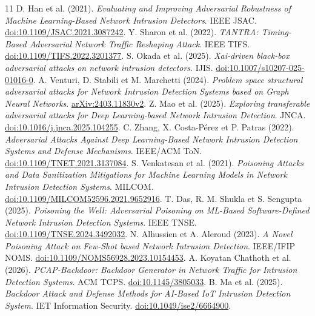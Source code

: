 \documentclass[a4paper,10pt]{article}
\begin{document}
\begingroup
\small
\setlength{\parskip}{0pt}
\renewcommand{\refname}{Références du corpus}
\begin{thebibliography}{11}
\setlength{\itemsep}{1pt}
 D. Han et al. (2021). \emph{Evaluating and Improving Adversarial
Robustness of Machine Learning-Based Network Intrusion Detectors}. IEEE JSAC.
\href{https://doi.org/10.1109/JSAC.2021.3087242}{doi:10.1109/JSAC.2021.3087242}.
 Y. Sharon et al. (2022). \emph{TANTRA: Timing-Based Adversarial
Network Traffic Reshaping Attack}. IEEE TIFS.
\href{https://doi.org/10.1109/TIFS.2022.3201377}{doi:10.1109/TIFS.2022.3201377}.
 S. Okada et al. (2025). \emph{Xai-driven black-box adversarial
attacks on network intrusion detectors}. IJIS.
\href{https://doi.org/10.1007/s10207-025-01016-0}{doi:10.1007/s10207-025-01016-0}.
 A. Venturi, D. Stabili et M. Marchetti (2024).
\emph{Problem space structural adversarial attacks for Network Intrusion
Detection Systems based on Graph Neural Networks}.
\href{https://arxiv.org/abs/2403.11830}{arXiv:2403.11830v2}.
 Z. Mao et al. (2025). \emph{Exploring transferable adversarial
attacks for Deep Learning-based Network Intrusion Detection}. JNCA.
\href{https://doi.org/10.1016/j.jnca.2025.104255}{doi:10.1016/j.jnca.2025.104255}.
 C. Zhang, X. Costa-Pérez et P. Patras (2022).
\emph{Adversarial Attacks Against Deep Learning-Based Network Intrusion
Detection Systems and Defense Mechanisms}. IEEE/ACM ToN.
\href{https://doi.org/10.1109/TNET.2021.3137084}{doi:10.1109/TNET.2021.3137084}.
 S. Venkatesan et al. (2021). \emph{Poisoning Attacks and
Data Sanitization Mitigations for Machine Learning Models in Network Intrusion
Detection Systems}. MILCOM.
\href{https://doi.org/10.1109/MILCOM52596.2021.9652916}{doi:10.1109/MILCOM52596.2021.9652916}.
 T. Das, R. M. Shukla et S. Sengupta (2025). \emph{Poisoning the
Well: Adversarial Poisoning on ML-Based Software-Defined Network Intrusion
Detection Systems}. IEEE TNSE.
\href{https://doi.org/10.1109/TNSE.2024.3492032}{doi:10.1109/TNSE.2024.3492032}.
 N. Alhussien et A. Aleroud (2023). \emph{A Novel Poisoning
Attack on Few-Shot based Network Intrusion Detection}. IEEE/IFIP NOMS.
\href{https://doi.org/10.1109/NOMS56928.2023.10154453}{doi:10.1109/NOMS56928.2023.10154453}.
 A. Koyatan Chathoth et al. (2026). \emph{PCAP-Backdoor:
Backdoor Generator in Network Traffic for Intrusion Detection Systems}.
ACM TCPS. \href{https://doi.org/10.1145/3805033}{doi:10.1145/3805033}.
 B. Ma et al. (2025). \emph{Backdoor Attack and Defense Methods for
AI-Based IoT Intrusion Detection System}. IET Information Security.
\href{https://doi.org/10.1049/ise2/6664900}{doi:10.1049/ise2/6664900}.
\end{thebibliography}
\endgroup
\end{document}
